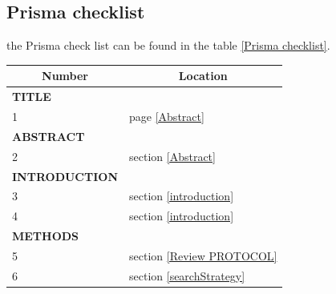 \subsection{Prisma checklist}
the Prisma check list can be found in the table \ref{Prisma checklist}.
\begin{table}[]
\begin{tabular}{|ll|l|}
\hline
\multicolumn{2}{|c|}{{\color[HTML]{000000} \textbf{Number}}} & \multicolumn{1}{c|}{{\color[HTML]{000000} \textbf{Location}}} \\ \hline
\multicolumn{2}{|l|}{\textbf{TITLE}}                         &                                                               \\ \hline
\multicolumn{2}{|l|}{1}                                      & page \ref{Abstract}                                                             \\ \hline
\multicolumn{2}{|l|}{\textbf{ABSTRACT}}                      &                                                               \\ \hline
\multicolumn{2}{|l|}{2}                                      & section \ref{Abstract}                                                             \\ \hline
\multicolumn{2}{|l|}{\textbf{INTRODUCTION}}                  &                                                               \\ \hline
\multicolumn{2}{|l|}{3}                                      & section \ref{introduction}                                                              \\ \hline
\multicolumn{2}{|l|}{4}                                      & section \ref{introduction}                                                               \\ \hline
\multicolumn{2}{|l|}{\textbf{METHODS}}                       &                                                               \\ \hline
\multicolumn{2}{|l|}{5}                                      & section \ref{Review PROTOCOL}                                                       \\ \hline
\multicolumn{2}{|l|}{6}                                      & section \ref{searchStrategy}                                           \\ \hline

\end{tabular}
\end{table}
